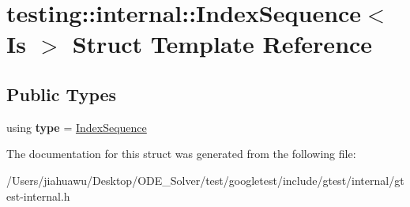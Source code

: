 \hypertarget{structtesting_1_1internal_1_1_index_sequence}{}\section{testing\+:\+:internal\+:\+:Index\+Sequence$<$ Is $>$ Struct Template Reference}
\label{structtesting_1_1internal_1_1_index_sequence}
\subsection*{Public Types}
\begin{DoxyCompactItemize}
\item 
\mbox{\label{structtesting_1_1internal_1_1_index_sequence_a89bb13a7b5d169b69659f395dcec2b2d}} 
using {\bfseries type} = \mbox{\hyperlink{structtesting_1_1internal_1_1_index_sequence}{Index\+Sequence}}
\end{DoxyCompactItemize}


The documentation for this struct was generated from the following file\+:\begin{DoxyCompactItemize}
\item 
/\+Users/jiahuawu/\+Desktop/\+O\+D\+E\+\_\+\+Solver/test/googletest/include/gtest/internal/gtest-\/internal.\+h\end{DoxyCompactItemize}
